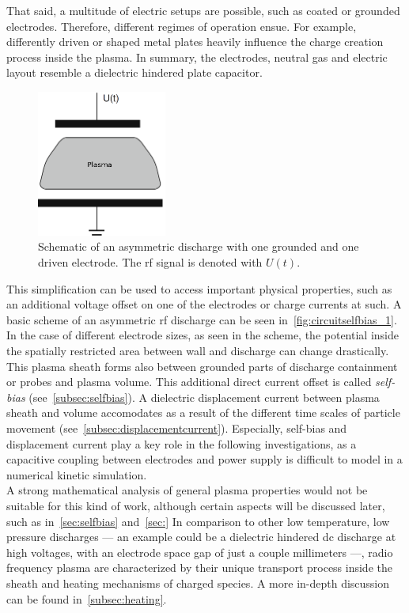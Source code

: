 			That said, a multitude of electric setups are possible, such as coated or grounded electrodes. Therefore, different regimes of operation ensue. For example, differently driven or shaped metal plates heavily influence the charge creation process inside the plasma. In summary, the electrodes, neutral gas and electric layout resemble a dielectric hindered plate capacitor.
%
		\begin{figure}
			\centering
			\includegraphics[width=0.38\textwidth]{figures/circuitselfbias_1.png}
			\caption{%
				Schematic of an asymmetric discharge with one grounded and one driven electrode.%
				The rf signal is denoted with $U(t)$.}%
				\label{fig:circuitselfbias_1}
		\end{figure}
%
		This simplification can be used to access important physical properties, such as an additional voltage offset on one of the electrodes or charge currents at such. A basic scheme of an asymmetric rf discharge can be seen in~\autoref{fig:circuitselfbias_1}. In the case of different electrode sizes, as seen in the scheme, the potential inside the spatially restricted area between wall and discharge can change drastically. This plasma sheath forms also between grounded parts of discharge containment or probes and plasma volume. This additional direct current offset is called \emph{self-bias} (see~\autoref{subsec:selfbias}). A dielectric displacement current between plasma sheath and volume accomodates as a result of the different time scales of particle movement (see~\autoref{subsec:displacementcurrent}). Especially, self-bias and displacement current play a key role in the following investigations, as a capacitive coupling between electrodes and power supply is difficult to model in a numerical kinetic simulation.\\
		A strong mathematical analysis of general plasma properties would not be suitable for this kind of work, although certain aspects will be discussed later, such as in~\autoref{sec:selfbias} and~\autoref{sec:}
		In comparison to other low temperature, low pressure discharges  --- an example could be a dielectric hindered dc discharge at high voltages, with an electrode space gap of just a couple millimeters ---, radio frequency plasma are characterized by their unique transport process inside the sheath and heating mechanisms of charged species. A more in-depth discussion can be found in~\autoref{subsec:heating}.\\ 
%
